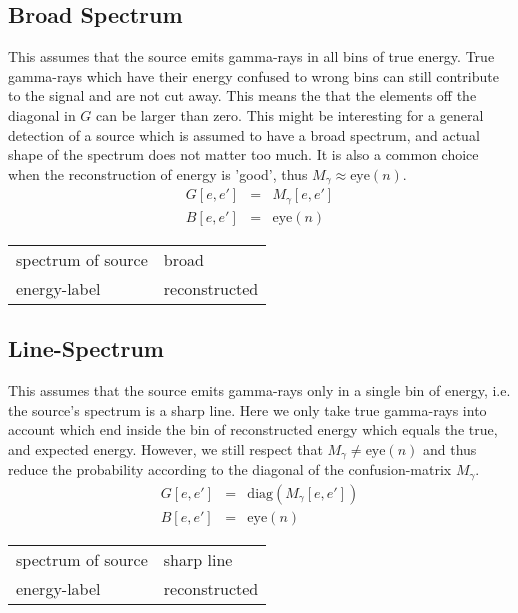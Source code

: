 \documentclass{article}%
\begin{document}
\subsection{Broad Spectrum}
%
This assumes that the source emits gamma-rays in all bins of true energy.
%
True gamma-rays which have their energy confused to wrong bins can still contribute to the signal and are not cut away.
%
This means the that the elements off the diagonal in $G$ can be larger than zero.
%
This might be interesting for a general detection of a source which is assumed to have a broad spectrum, and actual shape of the spectrum does not matter too much.
%
It is also a common choice when the reconstruction of energy is 'good', thus $M_\gamma \approx \mathrm{eye}(n)$.
%
\begin{eqnarray}
G[e, e'] &=& M_{\gamma}[e, e']
\\
B[e, e'] &=& \mathrm{eye}(n)
\end{eqnarray}
%
\begin{center}
\begin{tabular}{ll}
spectrum of source & broad\\
energy-label & reconstructed\\
\end{tabular}
\end{center}
%
\subsection{Line-Spectrum}
%
This assumes that the source emits gamma-rays only in a single bin of energy, i.e. the source's spectrum is a sharp line.
%
Here we only take true gamma-rays into account which end inside the bin of reconstructed energy which equals the true, and expected energy.
%
However, we still respect that $M_{\gamma} \neq \mathrm{eye}(n)$ and thus reduce the probability according to the diagonal of the confusion-matrix $M_{\gamma}$.
%
\begin{eqnarray}
G[e, e'] &=& \mathrm{diag}(M_{\gamma}[e, e'])
\\
B[e, e'] &=& \mathrm{eye}(n)
\end{eqnarray}
%
\begin{center}
\begin{tabular}{ll}
spectrum of source & sharp line\\
energy-label & reconstructed\\
\end{tabular}
\end{center}
%
\end{document}

